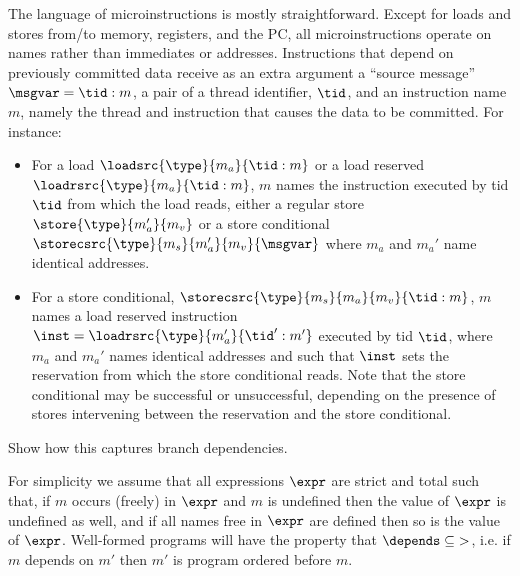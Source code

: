 The language of microinstructions is mostly straightforward. Except for loads and stores from/to memory, registers, and the PC, all microinstructions operate on names rather than immediates or addresses. Instructions that depend on previously committed data receive as an extra argument a ``source message'' $\msgvar=\tid:m$, a pair of a thread identifier, $\tid$, and an instruction name $m$, namely the thread and instruction that causes the data to be committed. For instance:
\begin{itemize}
\item For a load $\loadsrc{\type}{m_a}{\tid:m}$ or a
load reserved $\loadrsrc{\type}{m_a}{\tid:m}$, $m$ names the instruction executed by tid $\tid$ from which the load reads, either a regular store $\store{\type}{m_a'}{m_v}$ or a store conditional $\storecsrc{\type}{m_s}{m_a'}{m_v}{\msgvar}$ where
$m_a$ and $m_a'$ name identical addresses.
\item For a store conditional, $\storecsrc{\type}{m_s}{m_a}{m_v}{\tid:m}$,
$m$ names a load reserved instruction $\inst = \loadrsrc{\type}{m_a'}{\tid':m'}$ executed by tid $\tid$,
where $m_a$ and $m_a'$ names identical addresses and such that $\inst$ sets the reservation from which the store conditional reads. Note that the store conditional may be successful or unsuccessful, depending on the presence of stores intervening between the reservation and the store conditional.
\end{itemize}



\HERTIL

\begin{example}
Show how this captures branch dependencies.
\end{example}


For simplicity we assume that all expressions $\expr$ are strict and total such that, if $m$ occurs (freely) in $\expr$ and $m$ is undefined then the value of $\expr$ is undefined as well, and if all names free in $\expr$ are defined then so is the value of $\expr$. Well-formed programs will have the property that $\mbox{$\depends$}\subseteq \mbox{$>$}$, i.e. if $m$ depends on $m'$ then $m'$ is program ordered before $m$.

